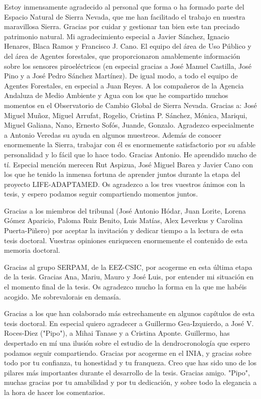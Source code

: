 Estoy inmensamente agradecido al personal que forma o ha formado parte del Espacio Natural de Sierra Nevada, que me han facilitado el trabajo en nuestra maravillosa Sierra. Gracias por cuidar y gestionar tan bien este tan preciado patrimonio natural. Mi agradecimiento especial a Javier Sánchez, Ignacio Henares, Blaca Ramos y Francisco J. Cano. El equipo del área de Uso Público y del área de Agentes forestales, que proporcionaron amablemente información sobre los sensores piroeléctricos (en especial gracias a José Manuel Castilla, José Pino y a José Pedro Sánchez Martínez). De igual modo, a todo el equipo de Agentes Forestales, en especial a Juan Reyes. A los compañeros de la Agencia Andaluza de Medio Ambiente y Agua con los que he compartido muchos momentos en el Observatorio de Cambio Global de Sierra Nevada. Gracias a: José Miguel Muñoz, Miguel Arrufat, Rogelio, Cristina P. Sánchez, Mónica, Mariqui, Miguel Galiana, Nano, Ernesto Sofós, Juande, Gonzalo. Agradezco especialmente a Antonio Veredas su ayuda en algunos muestreos. Además de conocer enormemente la Sierra, trabajar con él es enormemente satisfactorio por su afable personalidad y lo fácil que lo hace todo. Gracias Antonio. He aprendido mucho de tí. Especial mención merecen Rut Aspizua, José Miguel Barea y Javier Cano con los que he tenido la inmensa fortuna de aprender juntos durante la etapa del proyecto LIFE-ADAPTAMED. Os agradezco a los tres vuestros ánimos con la tesis, y espero podamos seguir compartiendo momentos juntos. 

Gracias a los miembros del tribunal (José Antonio Hódar, Juan Lorite, Lorena Gómez Aparicio, Paloma Ruiz Benito, Luis Matías, Alex Leverkus y Carolina Puerta-Piñero) por aceptar la invitación y dedicar tiempo a la lectura de esta tesis doctoral. Vuestras opiniones enriquecen enormemente el contenido de esta memoria doctoral.  

Gracias al grupo SERPAM, de la EEZ-CSIC, por acogerme en esta última etapa de la tesis. Gracias Ana, Mariu, Mauro y José Luis, por entender mi situación en el momento final de la tesis. Os agradezco mucho la forma en la que me habéis acogido. Me sobrevalorais en demasía. 

Gracias a los que han colaborado más estrechamente en algunos capítulos de esta tesis doctoral. En especial quiero agradecer a Guillermo Gea-Izquierdo, a José V. Roces-Diez ("Pipo"), a Mihai Tanase y a Cristina Aponte. Guillermo, has despertado en mí una ilusión sobre el estudio de la dendrocronología que espero podamos seguir compartiendo. Gracias por acogerme en el INIA, y gracias sobre todo por tu confianza, tu honestidad y tu franqueza. Creo que has sido uno de los pilares más importantes durante el desarrollo de la tesis. Gracias amigo. "Pipo", muchas gracias por tu amabilidad y por tu dedicación, y sobre todo la elegancia a la hora de hacer los comentarios. 

